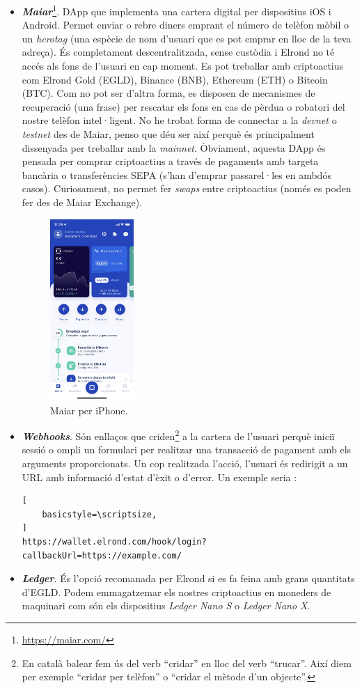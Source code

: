 \documentclass[11pt,a4paper]{article}
\begin{document}
\begin{itemize}
\item \textbf{\textit{Maiar}}\footnote{\url{https://maiar.com/}}. DApp que implementa una cartera digital per dispositius iOS i Android. Permet enviar o rebre diners emprant el número de telèfon mòbil o un \textit{herotag} (una espècie de nom d'usuari que es pot emprar en lloc de la teva adreça). És completament descentralitzada, sense custòdia i Elrond no té accés als fons de l'usuari en cap moment. Es pot treballar amb criptoactius com Elrond Gold (EGLD), Binance (BNB), Ethereum (ETH) o Bitcoin (BTC). Com no pot ser d'altra forma, es disposen de mecanismes de recuperació (una frase) per rescatar els fons en cas de pèrdua o robatori del nostre telèfon intel·ligent. No he trobat forma de connectar a la \textit{devnet} o \textit{testnet} des de Maiar, penso que déu ser així perquè és principalment dissenyada per treballar amb la \textit{mainnet}. Òbviament, aquesta DApp és pensada per comprar criptoactius a través de pagaments amb targeta bancària o transferències SEPA (s'han d'emprar passarel·les en ambdós casos). Curiosament, no permet fer \textit{swaps} entre criptoactius (només es poden fer des de Maiar Exchange).
\begin{figure}[h]
\includegraphics[width=0.3\textwidth]{maiarapp.png}
\centering
\caption{Maiar per iPhone.}\label{fig:maiarapp}
\end{figure} 
\item \textbf{\textit{Webhooks}}. Són enllaços que criden\footnote{En català balear fem ús del verb ``cridar'' en lloc del verb ``trucar''. Així diem per exemple ``cridar per telèfon'' o ``cridar el mètode d'un objecte''.} a la cartera de l'usuari perquè iniciï sessió o ompli un formulari per realitzar una transacció de pagament amb els arguments proporcionats. Un cop realitzada l'acció, l'usuari és redirigit a un URL amb informació d'estat d'èxit o d'error. Un exemple seria \cite{elrond2022}:
\begin{lstlisting}[
    basicstyle=\scriptsize,
]
https://wallet.elrond.com/hook/login?callbackUrl=https://example.com/
\end{lstlisting}
\item \textbf{\textit{Ledger}}. És l'opció recomanada per Elrond si es fa feina amb grans quantitats d'EGLD. Podem emmagatzemar els nostres criptoactius en moneders de maquinari com són els dispositius \textit{Ledger Nano S} o \textit{Ledger Nano X}.
\end{itemize}
\end{document}
